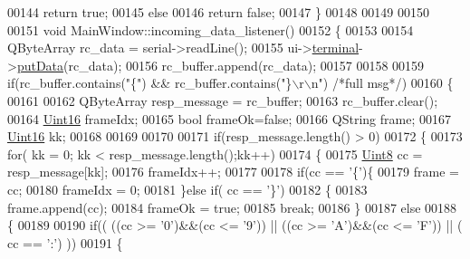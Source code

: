\begin{DoxyCode}
{00144         \textcolor{keywordflow}{return} \textcolor{keyword}{true};
00145     \textcolor{keywordflow}{else}
00146         \textcolor{keywordflow}{return} \textcolor{keyword}{false};
00147 \}
00148 
00149 
00150 
00151 \textcolor{keywordtype}{void} MainWindow::incoming\_data\_listener()
00152 \{
00153 
00154     QByteArray rc\_data = serial->readLine();
00155     ui->\hyperlink{a00080_aae71c46ea4546df5994735dee573b2dd}{terminal}->\hyperlink{a00005_aa744a0868e01a13a502710f895f01525}{putData}(rc\_data);
00156     rc\_buffer.append(rc\_data);
00157 
00158 
00159     \textcolor{keywordflow}{if}(rc\_buffer.contains(\textcolor{stringliteral}{"\{"}) && rc\_buffer.contains(\textcolor{stringliteral}{"\}\(\backslash\)r\(\backslash\)n"}) \textcolor{comment}{/*full msg*/})
00160     \{
00161 
00162         QByteArray resp\_message = rc\_buffer;
00163         rc\_buffer.clear();
00164         \hyperlink{a00004_aae7407b021d43f7193a81a58cfb3e297}{Uint16}          frameIdx;
00165         \textcolor{keywordtype}{bool}            frameOk=\textcolor{keyword}{false};
00166         QString         frame;
00167         \hyperlink{a00004_aae7407b021d43f7193a81a58cfb3e297}{Uint16}          kk;
00168 
00169 
00170 
00171              \textcolor{keywordflow}{if}(resp\_message.length() > 0)
00172              \{
00173                   \textcolor{keywordflow}{for}( kk = 0; kk < resp\_message.length();kk++)
00174                   \{
00175                       \hyperlink{a00004_a979e3e23b9a449e69ab6a8a83b6042f8}{Uint8} cc = resp\_message[kk];
00176                       frameIdx++;
00177 
00178                       \textcolor{keywordflow}{if}(cc == \textcolor{charliteral}{'\{'})\{
00179                                   frame    = cc;
00180                                   frameIdx = 0;
00181                       \}\textcolor{keywordflow}{else} \textcolor{keywordflow}{if}( cc == \textcolor{charliteral}{'\}'})
00182                       \{
00183                                   frame.append(cc);
00184                                   frameOk = \textcolor{keyword}{true};
00185                                   \textcolor{keywordflow}{break};
00186                       \}
00187                       \textcolor{keywordflow}{else}
00188                       \{
00189 
00190                                    \textcolor{keywordflow}{if}(( ((cc >= \textcolor{charliteral}{'0'})&&(cc <= \textcolor{charliteral}{'9'})) || ((cc >= \textcolor{charliteral}{'A'})&&(cc <= \textcolor{charliteral}{'F'})) || ( cc ==
       \textcolor{charliteral}{':'}) ))
00191                                    \{
}
\end{DoxyCode}
